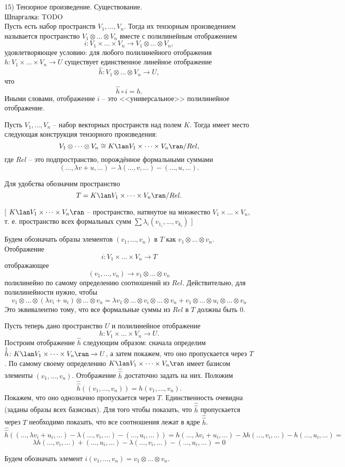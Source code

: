 15) Тензорное произведение. Существование.\\

Шпаргалка: TODO\\

\dfn Пусть есть набор пространств $V_1, \dots,V_n$. Тогда их тензорным произведением называется пространство 
$V_1\otimes \dots \otimes V_n$ вместе с полилинейным отображением
$$i \colon V_1 \times \dots \times V_n \to V_1 \otimes \dots \otimes V_n,$$
удовлетворяющее условию: для любого полилинейного отображения $h\colon V_1\times \dots \times V_n \to U$ существует единственное линейное отображение 
$$\hat{h}\colon V_1\otimes \dots \otimes V_n \to U,$$
что 
$$\hat{h}\circ i=h.$$
Иными словами, отображение $i$ -- это <<универсальное>> полилинейное отображение.
\edfn 

\thrm Пусть $V_1,\dots,V_n$ -- набор векторных пространств над полем $K$. Тогда имеет место следующая конструкция тензорного произведения:
$$V_1 \otimes \dots \otimes V_n \cong K\lan V_1 \times \dots \times V_n \ran / Rel,$$
где $Rel$ -- это подпространство, порождённое формальными суммами
$$(\dots, \lambda v+u, \dots) - \lambda (\dots,v, \dots) - (\dots, u, \dots).$$ 
\proof

Для удобства обозначим пространство
$$T=K\lan V_1 \times \dots \times V_n \ran / Rel.$$

[ $K\lan V_1 \times \dots \times V_n \ran$ -- пространство, натянутое на множество $V_1 \times \dots \times V_n$, т. е. пространство всех формальных сумм $\sum\lambda_i(v_{1_i}, \dots, v_{k_i})$  ]

Будем обозначать образы элементов $(v_1,\dots, v_n)$ в $T$ как  $v_1\otimes \dots \otimes v_n$. Отображение $$i \colon V_1\times \dots \times V_n \to T$$
отображающее 
$$(v_1,\dots,v_n) \to v_1\otimes \dots \otimes v_n$$
полилинейно по самому определению соотношений из $Rel$. Действительно, для полилинейности нужно, чтобы
$$v_1 \otimes \dots \otimes (\lambda v_i+u_i) \otimes \dots \otimes v_n =
\lambda v_1 \otimes \dots \otimes v_i \otimes \dots \otimes v_n +
v_1 \otimes \dots \otimes u_i \otimes \dots \otimes v_n$$
Это эквивалентно тому, что все формальные суммы из $Rel$ в $T$ должны быть 0.

Пусть теперь дано пространство $U$ и полилинейное отображение $$h \colon V_1\times \dots \times V_n \to U.$$
Построим отображение $\hat{h}$ следующим образом: сначала определим $\hat{\hat{h}}\colon K\lan V_1 \times \dots \times V_n \ran \to U$, а затем покажем, что оно пропускается через $T$. По самому своему определению $K\lan V_1 \times \dots \times V_n \ran$ имеет базисом элементы $(v_1,\dots,v_n)$. Отображение $\hat{\hat{h}}$ достаточно задать на них. Положим $$\hat{\hat{h}}((v_1,\dots,v_n))=h(v_1,\dots,v_n).$$
Покажем, что оно однозначно пропускается через $T$. Единственность очевидна (заданы образы всех базисных). Для того чтобы показать, что $\hat{\hat{h}}$ пропускается через $T$ необходимо показать, что все соотношения лежат в ядре $\hat{\hat{h}}$.
$$\hat{\hat{h}}((\dots, \lambda v_i + u_i, \dots) - \lambda(\dots, v_i, \dots) - (\dots, u_i, \dots))=h(\dots, \lambda v_i + u_i, \dots) - \lambda h(\dots, v_i, \dots) - h(\dots, u_i, \dots) =$$
$$\lambda h(\dots, v_i, \dots) + (\dots, u_i, \dots) - \lambda(\dots, v_i, \dots) - (\dots, u_i, \dots) = 0$$
\endproof
\ethrm

\dfn Будем обозначать элемент $i(v_1,\dots,v_n)=v_1\otimes \dots \otimes v_n$. 
\edfn
